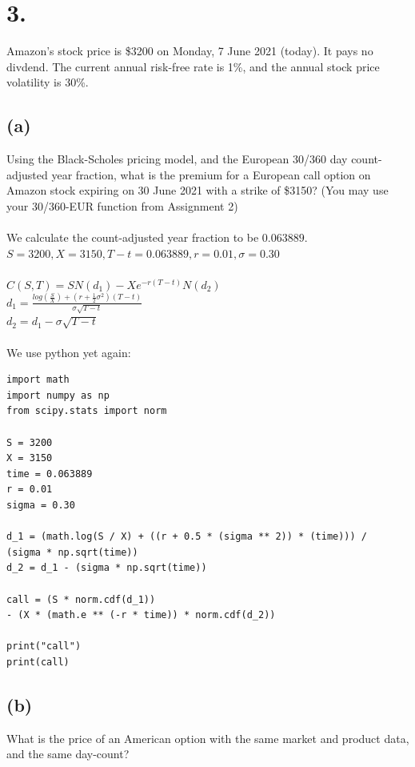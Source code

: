 \documentclass{article}
\begin{document}
\section*{3.}
{\Large 

Amazon's stock price is \$3200 on Monday, 7 June 2021 (today). It pays no divdend. The current annual risk-free rate is 1\%, and the annual stock price volatility is 30\%.

\subsection*{(a)}

Using the Black-Scholes pricing model, and the European 30/360 day count-adjusted year fraction, what is the premium for a European call option on Amazon stock expiring on 30 June 2021 with a strike of \$3150? (You may use your 30/360-EUR function from Assignment 2) \\ \\

We calculate the count-adjusted year fraction to be $0.063889$. \\
$S = 3200, X = 3150, T-t = 0.063889, r = 0.01, \sigma = 0.30$ \\ \\
$C(S, T) = SN(d_1) - Xe^{-r(T-t)}N(d_2)$ \\
$d_1 = \frac{log(\frac{S}{X}) + (r+\frac{1}{2}\sigma^2)(T-t)}{\sigma\sqrt{T-t}}$ \\
$d_2 = d_1 - \sigma\sqrt{T-t}$ \\ \\
We use python yet again:
\begin{verbatim}
import math
import numpy as np
from scipy.stats import norm

S = 3200
X = 3150
time = 0.063889
r = 0.01
sigma = 0.30

d_1 = (math.log(S / X) + ((r + 0.5 * (sigma ** 2)) * (time))) / 
(sigma * np.sqrt(time))
d_2 = d_1 - (sigma * np.sqrt(time))

call = (S * norm.cdf(d_1)) 
- (X * (math.e ** (-r * time)) * norm.cdf(d_2))

print("call")
print(call)
\end{verbatim}

\subsection*{(b)}

What is the price of an American option with the same market and product data, and the same day-count?

}
\end{document}
